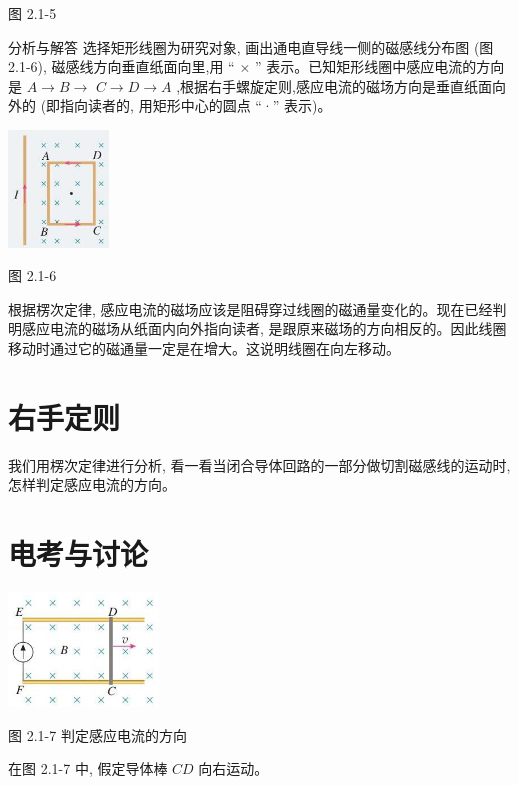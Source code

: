 \documentclass[10pt]{article}
\begin{document}
图 2.1-5

分析与解答 选择矩形线圈为研究对象, 画出通电直导线一侧的磁感线分布图 (图 2.1-6), 磁感线方向垂直纸面向里,用 “ \(\times\) ” 表示。已知矩形线圈中感应电流的方向是 \(A \rightarrow B \rightarrow\) \(C \rightarrow D \rightarrow A\) ,根据右手螺旋定则,感应电流的磁场方向是垂直纸面向外的 (即指向读者的, 用矩形中心的圆点 “·” 表示)。

\begin{center}
\includegraphics[max width=0.2\textwidth]{images/01910e72-c5b7-7ed5-a6d4-fb3a5faefc32_32_970453.jpg}
\end{center}

图 2.1-6

根据楞次定律, 感应电流的磁场应该是阻碍穿过线圈的磁通量变化的。现在已经判明感应电流的磁场从纸面内向外指向读者, 是跟原来磁场的方向相反的。因此线圈移动时通过它的磁通量一定是在增大。这说明线圈在向左移动。

\section*{右手定则}

我们用楞次定律进行分析, 看一看当闭合导体回路的一部分做切割磁感线的运动时, 怎样判定感应电流的方向。

\section*{电考与讨论}

\begin{center}
\includegraphics[max width=0.3\textwidth]{images/01910e72-c5b7-7ed5-a6d4-fb3a5faefc32_33_893522.jpg}
\end{center}

图 2.1-7 判定感应电流的方向

在图 2.1-7 中, 假定导体棒 \({CD}\) 向右运动。
\end{document}
